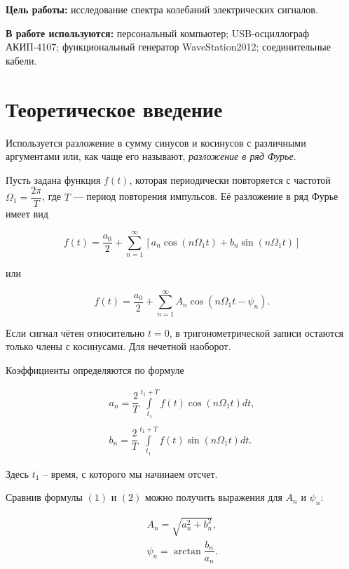 \textbf{Цель работы:} исследование спектра колебаний электрических сигналов.

\textbf{В работе используются:} персональный  компьютер; USB-осциллограф  АКИП-4107; функциональный генератор WaveStation2012; соединительные кабели.
                    
\section{Теоретическое введение}

Используется разложение в сумму синусов и косинусов с различными аргументами или, как чаще его называют, \textit{разложение в ряд Фурье}.

Пусть задана функция $f(t)$, которая периодически повторяется с частотой $\Omega_1 = \dfrac{2\pi}{T}$, где $T$ --- период повторения импульсов. Её разложение в ряд Фурье имеет вид 

\begin{equation}
    f(t) = \dfrac{a_0}{2} + \sum\limits_{n = 1}^{\infty}\left[a_n \cos \left(n \Omega_1t\right) + b_n \sin \left(n \Omega_1t\right)\right]
\end{equation}

или

\begin{equation}
    f(t) = \dfrac{a_0}{2} + \sum\limits_{n = 1}^{\infty}A_n \cos \left(n\Omega_1t-\psi_n\right).
\end{equation}

Если сигнал чётен относительно $t = 0$, в тригонометрической записи остаются только члены с косинусами. Для нечетной наоборот.

Коэффициенты определяются по формуле

\begin{equation}
    \begin{array}{c}
        a_n  = \dfrac{2}{T}\int\limits_{t_1}^{t_1+T}f(t)\cos\left(n \Omega_1 t\right) dt,\\
        \\
        b_n = \dfrac{2}{T}\int\limits_{t_1}^{t_1+T}f(t)\sin\left(n \Omega_1 t\right) dt.
    \end{array}
\end{equation}

Здесь $t_1$ -- время, с которого мы начинаем отсчет.

Сравнив формулы $(1)$ и $(2)$ можно получить выражения для $A_n$  и $\psi_n$:

\begin{equation}
    \begin{array}{l}
        A_n = \sqrt{a_n^2+b_n^2},\\
        \psi_n = \arctan \dfrac{b_n}{a_n}.
    \end{array}
\end{equation}


